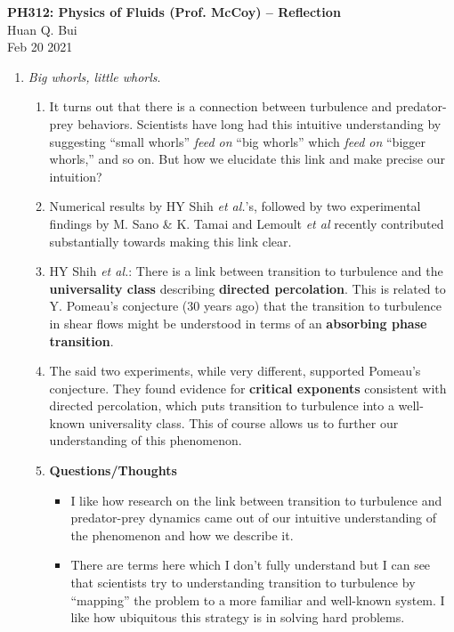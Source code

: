 \documentclass[11pt]{article}
\begin{document}
\begin{center}
{\large \bf PH312: Physics of Fluids (Prof. McCoy) -- Reflection}\\
{ Huan Q. Bui}\\
Feb 20 2021
\end{center}




\begin{enumerate}
	\item \textit{Big whorls, little whorls}. 
	\begin{enumerate}
		\item It turns out that there is a connection between turbulence and predator-prey behaviors. Scientists have long had this intuitive understanding by suggesting ``small whorls'' \textit{feed on} ``big whorls'' which \textit{feed on} ``bigger whorls,'' and so on. But how we elucidate this link and make precise our intuition?
		
		\item Numerical results by HY Shih \textit{et al.}'s, followed by two experimental findings by M. Sano \&  K. Tamai and Lemoult \textit{et al} recently contributed substantially towards making this link clear. 
		
		\item HY Shih \textit{et al.}: There is a link between transition to turbulence and the \textbf{universality class} describing \textbf{directed percolation}. This is related to Y. Pomeau's conjecture (30 years ago) that the transition to turbulence in shear flows might be understood in terms of an \textbf{absorbing phase transition}. 
		
		\item The said two experiments, while very different, supported Pomeau's conjecture. They found evidence for \textbf{critical exponents} consistent with directed percolation, which puts transition to turbulence into a well-known universality class. This of course allows us to further our understanding of this phenomenon.

	
	\item \textbf{Questions/Thoughts} 
	\begin{itemize}
		\item I like how research on the link between transition to turbulence and predator-prey dynamics came out of our intuitive understanding of the phenomenon and how we describe it.
		
		\item There are terms here which I don't fully understand but I can see that scientists try to understanding transition to turbulence by ``mapping'' the problem to a more familiar and well-known system. I like how ubiquitous this strategy is in solving hard problems.
		

\end{itemize}
\end{enumerate}
\end{enumerate}
\end{document}
